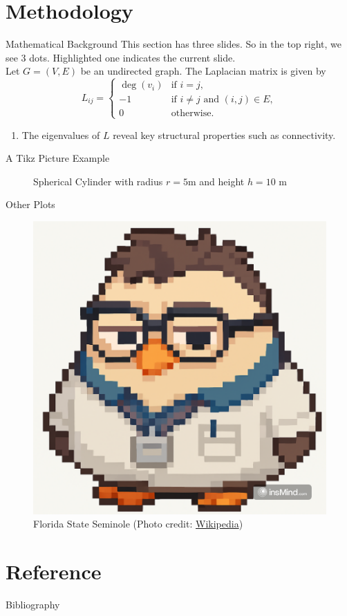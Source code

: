 \documentclass{beamer}
\begin{document}
\section{Methodology}
\begin{frame}{Mathematical Background}
    This section has three slides. So in the top right, we see 3 dots. Highlighted one indicates the current slide.\\
    Let $G = (V, E)$ be an undirected graph. The Laplacian matrix is given by
        \[
        L_{ij} =
        \begin{cases}
        \deg(v_i) & \text{if } i = j, \\
        -1 & \text{if } i \neq j \text{ and } (i,j) \in E, \\
        0 & \text{otherwise}.
        \end{cases}
        \]
    \begin{enumerate}
        \item The eigenvalues of $L$ reveal key structural properties such as connectivity.
    \end{enumerate}
\end{frame}
\begin{frame}{A Tikz Picture Example}
    \begin{figure}
        \centering
        \caption{ Spherical Cylinder with radius $r=5$m and height $h=10$ m}
        \label{fig:fig1}
    \end{figure}
\end{frame}
\begin{frame}{Other Plots}
    \begin{figure}
    \centering
    \includegraphics[width=0.5\linewidth]{images/seminole.png}
    \caption{ Florida State Seminole (Photo credit: \href{https://en.wikipedia.org/wiki/Florida_State_Seminoles}{Wikipedia})}
    \label{fig:enter-label}
    \end{figure}
\end{frame}
\section{Reference}
\begin{frame}{Bibliography}

\end{frame}
\end{document}
